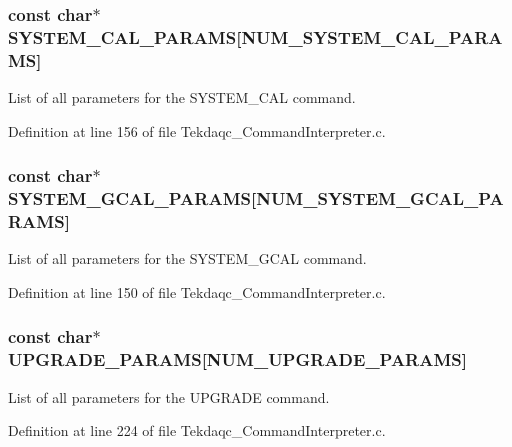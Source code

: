 \hypertarget{group__command__interpreter_ga012ad2ab047f56ee2f1bbe24441f46d3}{
\subsubsection[{S\-Y\-S\-T\-E\-M\-\_\-\-C\-A\-L\-\_\-\-P\-A\-R\-A\-M\-S}]{\setlength{\rightskip}{0pt plus 5cm}const char$\ast$ S\-Y\-S\-T\-E\-M\-\_\-\-C\-A\-L\-\_\-\-P\-A\-R\-A\-M\-S\mbox{[}{\bf N\-U\-M\-\_\-\-S\-Y\-S\-T\-E\-M\-\_\-\-C\-A\-L\-\_\-\-P\-A\-R\-A\-M\-S}\mbox{]}}}\label{group__command__interpreter_ga012ad2ab047f56ee2f1bbe24441f46d3}
List of all parameters for the S\-Y\-S\-T\-E\-M\-\_\-\-C\-A\-L command. 

Definition at line 156 of file Tekdaqc\-\_\-\-Command\-Interpreter.\-c.

\hypertarget{group__command__interpreter_ga12cbb3a7ff1264641a75db037130c062}{
\subsubsection[{S\-Y\-S\-T\-E\-M\-\_\-\-G\-C\-A\-L\-\_\-\-P\-A\-R\-A\-M\-S}]{\setlength{\rightskip}{0pt plus 5cm}const char$\ast$ S\-Y\-S\-T\-E\-M\-\_\-\-G\-C\-A\-L\-\_\-\-P\-A\-R\-A\-M\-S\mbox{[}{\bf N\-U\-M\-\_\-\-S\-Y\-S\-T\-E\-M\-\_\-\-G\-C\-A\-L\-\_\-\-P\-A\-R\-A\-M\-S}\mbox{]}}}\label{group__command__interpreter_ga12cbb3a7ff1264641a75db037130c062}
List of all parameters for the S\-Y\-S\-T\-E\-M\-\_\-\-G\-C\-A\-L command. 

Definition at line 150 of file Tekdaqc\-\_\-\-Command\-Interpreter.\-c.

\hypertarget{group__command__interpreter_gaf4f7b3cf35167e36d202bb65a02f0b71}{
\subsubsection[{U\-P\-G\-R\-A\-D\-E\-\_\-\-P\-A\-R\-A\-M\-S}]{\setlength{\rightskip}{0pt plus 5cm}const char$\ast$ U\-P\-G\-R\-A\-D\-E\-\_\-\-P\-A\-R\-A\-M\-S\mbox{[}{\bf N\-U\-M\-\_\-\-U\-P\-G\-R\-A\-D\-E\-\_\-\-P\-A\-R\-A\-M\-S}\mbox{]}}}\label{group__command__interpreter_gaf4f7b3cf35167e36d202bb65a02f0b71}
List of all parameters for the U\-P\-G\-R\-A\-D\-E command. 

Definition at line 224 of file Tekdaqc\-\_\-\-Command\-Interpreter.\-c.

